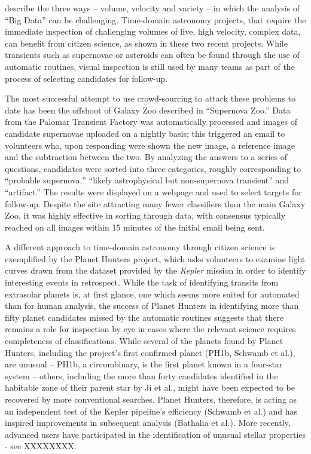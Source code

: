 \documentclass{ar2e}
\begin{document}
\citet{threeVs} describe the three ways -- volume, velocity and variety -- in
which the analysis of ``Big Data'' can be challenging. Time-domain astronomy
projects, that require the immediate inspection of challenging volumes of live,
high velocity, complex data, can benefit from citizen science, as shown in these
two recent projects.  While transients such as supernovae or asteroids can often
be found through the use of automatic routines, visual inspection is still used
by many teams as part of the process of selecting candidates for follow-up. 


The most successful attempt to use crowd-sourcing to attack these problems to
date has been the offshoot of Galaxy Zoo described in \citet{SmithSN} ``Supernova
Zoo.'' Data from the Palomar Transient Factory \citep{LawPTF} was automatically
processed and images of candidate supernovae uploaded on a nightly basis; this
triggered an email to volunteers who, upon responding were shown the new image,
a reference image and the subtraction between the two. By analyzing the answers
to a series of questions, candidates were sorted into three categories, roughly
corresponding to ``probable supernova,'' ``likely astrophysical but
non-supernova transient'' and ``artifact.'' The results were displayed on a
webpage and used to select targets for follow-up. Despite the site attracting
many fewer classifiers than the main Galaxy Zoo, it was highly effective in
sorting through data, with consensus typically reached on all images within 15
minutes of the initial email being sent. 


A different approach to time-domain astronomy through citizen science is
exemplified by the Planet Hunters project, which asks volunteers to examine
light curves drawn from the dataset provided by the \emph{Kepler} mission in
order to identify interesting events in retrospect. While the task of
identifying transits from extrasolar planets is, at first glance, one which
seems more suited for automated than for human analysis, the success of Planet
Hunters in identifying more than fifty planet candidates missed by the automatic
routines suggests that there remains a role for inspection by eye in cases where
the relevant science requires completeness of classifications. While several of
the planets found by Planet Hunters, including the project's first confirmed
planet (PH1b, Schwamb et al.), are unusual  -- PH1b, a circumbinary, is the
first planet known in a four-star system --  others, including the more than
forty candidates identified in the habitable zone of their parent star by Ji et
al., might have been expected to be recovered by more conventional searches.
Planet Hunters, therefore, is acting as an independent test of the Kepler
pipeline's efficiency (Schwamb et al.) and has inspired improvements in
subsequent analysis (Bathalia et al.). More recently, advanced users have
participated in the identification of unusual stellar properties - see
XXXXXXXX. 
\end{document}
